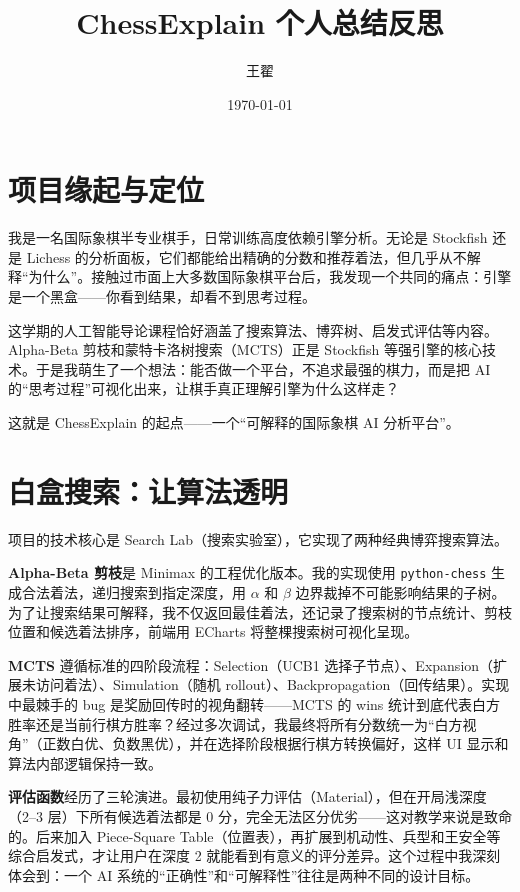 \documentclass[12pt,a4paper]{ctexart}
\title{\textbf{ChessExplain 个人总结反思}}
\author{王翟 \quad 2024011226}
\date{\today}
\begin{document}
\sloppy

\maketitle

\section{项目缘起与定位}

我是一名国际象棋半专业棋手，日常训练高度依赖引擎分析。无论是 Stockfish 还是 Lichess 的分析面板，它们都能给出精确的分数和推荐着法，但几乎从不解释“为什么”。接触过市面上大多数国际象棋平台后，我发现一个共同的痛点：引擎是一个黑盒——你看到结果，却看不到思考过程。

这学期的人工智能导论课程恰好涵盖了搜索算法、博弈树、启发式评估等内容。Alpha-Beta 剪枝和蒙特卡洛树搜索（MCTS）正是 Stockfish 等强引擎的核心技术。于是我萌生了一个想法：能否做一个平台，不追求最强的棋力，而是把 AI 的“思考过程”可视化出来，让棋手真正理解引擎为什么这样走？

这就是 ChessExplain 的起点——一个“可解释的国际象棋 AI 分析平台”。

\section{白盒搜索：让算法透明}

项目的技术核心是 Search Lab（搜索实验室），它实现了两种经典博弈搜索算法。

\textbf{Alpha-Beta 剪枝}是 Minimax 的工程优化版本。我的实现使用 \texttt{python-chess} 生成合法着法，递归搜索到指定深度，用 $\alpha$ 和 $\beta$ 边界裁掉不可能影响结果的子树。为了让搜索结果可解释，我不仅返回最佳着法，还记录了搜索树的节点统计、剪枝位置和候选着法排序，前端用 ECharts 将整棵搜索树可视化呈现。

\textbf{MCTS} 遵循标准的四阶段流程：Selection（UCB1 选择子节点）、Expansion（扩展未访问着法）、Simulation（随机 rollout）、Backpropagation（回传结果）。实现中最棘手的 bug 是奖励回传时的视角翻转——MCTS 的 wins 统计到底代表白方胜率还是当前行棋方胜率？经过多次调试，我最终将所有分数统一为“白方视角”（正数白优、负数黑优），并在选择阶段根据行棋方转换偏好，这样 UI 显示和算法内部逻辑保持一致。

\textbf{评估函数}经历了三轮演进。最初使用纯子力评估（Material），但在开局浅深度（2--3 层）下所有候选着法都是 0 分，完全无法区分优劣——这对教学来说是致命的。后来加入 Piece-Square Table（位置表），再扩展到机动性、兵型和王安全等综合启发式，才让用户在深度 2 就能看到有意义的评分差异。这个过程中我深刻体会到：一个 AI 系统的“正确性”和“可解释性”往往是两种不同的设计目标。
\end{document}
